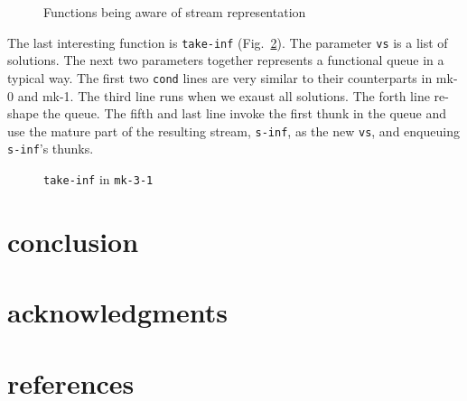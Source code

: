 \documentclass[format=acmlarge, review=true, authordraft=true]{acmart}
\begin{document}
\begin{figure}
	 	
	 \caption{Functions being aware of stream representation}
	 \label{interface}
\end{figure}


The last interesting function is \texttt{take-inf} (Fig.~\ref{take-inf-3-1}). The parameter \texttt{vs} is a list of solutions. The next two parameters together represents a functional queue in a typical way. The first two \texttt{cond} lines are very similar to their counterparts in mk-0 and mk-1. The third line runs when we exaust all solutions. The forth line re-shape the queue. The fifth and last line invoke the first thunk in the queue and use the mature part of the resulting stream, \texttt{s-inf}, as the new \texttt{vs}, and enqueuing \texttt{s-inf}'s thunks.

\begin{figure}
	 	
	 \caption{\texttt{take-inf} in \texttt{mk-3-1}}
	 \label{take-inf-3-1}
\end{figure}



\section{conclusion}

\section*{acknowledgments}

\section*{references}
\end{document}
